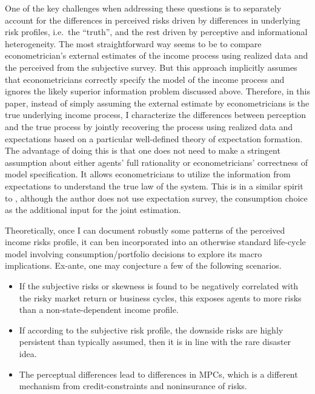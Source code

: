 \documentclass[12pt,notitlepage,onecolumn,aps,pra]{article}
\begin{document}
One of the key challenges when addressing these questions is to
separately account for the differences in perceived risks driven by
differences in underlying risk profiles, i.e.~the ``truth'', and the
rest driven by perceptive and informational heterogeneity. The most
straightforward way seems to be to compare econometrician's external
estimates of the income process using realized data and the perceived
from the subjective survey. But this approach implicitly assumes that
econometricians correctly specify the model of the income process and
ignores the likely superior information problem discussed above.
Therefore, in this paper, instead of simply assuming the external
estimate by econometricians is the true underlying income process, I
characterize the differences between perception and the true process by
jointly recovering the process using realized data and expectations
based on a particular well-defined theory of expectation formation. The
advantage of doing this is that one does not need to make a stringent
assumption about either agents' full rationality or econometricians'
correctness of model specification. It allows econometricians to utilize
the information from expectations to understand the true law of the
system. This is in a similar spirit to \cite{guvenen_inferring_2014},
although the author does not use expectation survey, the consumption
choice as the additional input for the joint estimation.

Theoretically, once I can document robustly some patterns of the
perceived income risks profile, it can ben incorporated into an
otherwise standard life-cycle model involving consumption/portfolio
decisions to explore its macro implications. Ex-ante, one may conjecture
a few of the following scenarios.

\begin{itemize}
\item
  If the subjective risks or skewness is found to be negatively
  correlated with the risky market return or business cycles, this
  exposes agents to more risks than a non-state-dependent income
  profile.
\item
  If according to the subjective risk profile, the downside risks are
  highly persistent than typically assumed, then it is in line with the
  rare disaster idea.
\item
  The perceptual differences lead to differences in MPCs, which is a
  different mechanism from credit-constraints and noninsurance of risks.
\end{itemize}
\end{document}
